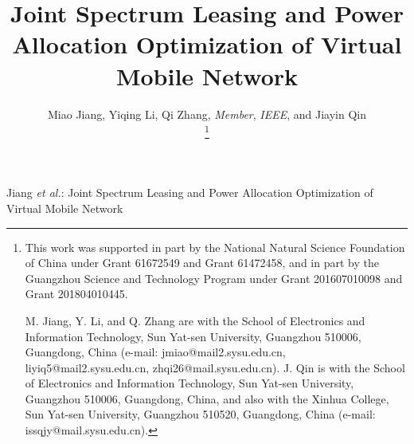\documentclass[journal]{IEEEtran}
\begin{document}
	
\title{Joint Spectrum Leasing and Power Allocation Optimization of Virtual Mobile Network}
	
\author{Miao Jiang, Yiqing Li, Qi Zhang, \emph{Member}, \emph{IEEE}, and Jiayin Qin

\thanks{This work was supported in part by the National Natural Science Foundation of China under Grant 61672549 and Grant 61472458, and in part by the Guangzhou Science and Technology Program under Grant 201607010098 and Grant 201804010445.

M. Jiang, Y. Li, and Q. Zhang are with the School of Electronics and Information Technology, Sun Yat-sen University, Guangzhou 510006, Guangdong, China (e-mail: jmiao@mail2.sysu.edu.cn, liyiq5@mail2.sysu.edu.cn, zhqi26@mail.sysu.edu.cn). J. Qin is with the School of Electronics and
Information Technology, Sun Yat-sen University, Guangzhou 510006, Guangdong,  China, and also with the Xinhua College, Sun Yat-sen University, Guangzhou 510520, Guangdong, China (e-mail: issqjy@mail.sysu.edu.cn). }
}%
	
	
{Jiang \MakeLowercase{\textit{et al.}}: Joint Spectrum Leasing and Power Allocation Optimization of Virtual Mobile Network}
	
\end{document}

